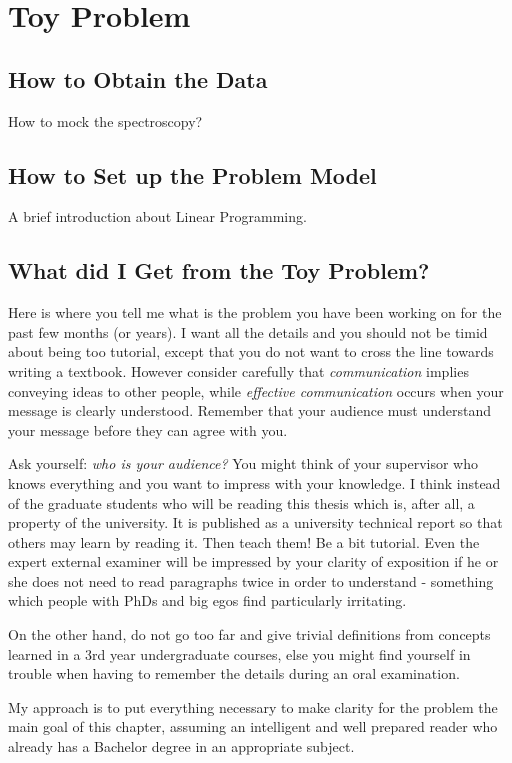 \label{chapter:toyproblem}
\section{Toy Problem}
\subsection{How to Obtain the Data}
How to mock the spectroscopy?
\subsection{How to Set up the Problem Model}
A brief introduction about Linear Programming.
\subsection{What did I Get from the Toy Problem?}

\newlength{\savedunitlength}
\setlength{\unitlength}{2em}

Here is where you tell me what is the problem you have been working on for the past few months (or years). I want all the details and you should not be timid about being too tutorial, except that you do not want to cross the line towards writing a textbook. However consider carefully that \textit{communication} implies conveying ideas to other people, while \textit{effective communication} occurs when your message is clearly understood. Remember that your audience must understand your message before they can agree with you.

Ask yourself:
\textit{who is your audience?} You might think of your supervisor who knows everything and you want to impress with your knowledge. I think instead of the graduate students who will be reading this thesis which is, after all, a property of the university. It is published as a university technical report so that others may learn by reading it. Then teach them! Be a bit tutorial. Even the expert external examiner will be impressed by your clarity of exposition if he or she does not need to read paragraphs twice in order to understand - something which people with PhDs and big egos find particularly irritating.

On the other hand, do not go too far and give trivial definitions from concepts learned in a 3rd year undergraduate courses, else you might find yourself in trouble when having to remember the details during an oral examination.

My approach is to put everything necessary to make clarity for
the problem the main goal of this chapter, assuming an intelligent and well prepared reader who already has a Bachelor degree in an appropriate subject.

